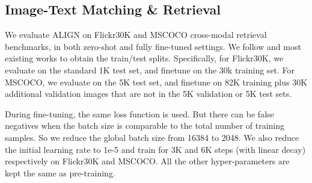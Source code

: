 \documentclass{article}
\begin{document}
\begin{table}[t]
\centering
\small
\caption{Spearman's R Bootstrap Correlation () on Crisscrossed Captions~(CxC) dataset. ALIGN is compared with VSE++~\cite{faghri:vse++}, VSRN~\cite{li:vsrn}, DE\textsubscript{I2T}~\cite{parekh:cxc}, and DE\textsubscript{T2T+I2T}~\cite{parekh:cxc}.}
\label{tab:cxc_spearman_corr}
\vspace{2mm}
\vspace{-5mm}
\end{table}

\vspace{-2mm}
\subsection{Image-Text Matching \& Retrieval}

We evaluate ALIGN on Flickr30K and MSCOCO cross-modal retrieval benchmarks, in both zero-shot and fully fine-tuned settings. We follow \cite{karpathy:image-text2015} and most existing works to obtain the train/test splits. Specifically, for Flickr30K, we evaluate on the standard 1K test set, and finetune on the 30k training set. For MSCOCO, we evaluate on the 5K test set, and finetune on 82K training plus 30K additional validation images that are not in the 5K validation or 5K test sets.

During fine-tuning, the same loss function is used. But there can be false negatives when the batch size is comparable to the total number of training samples. So we reduce the global batch size from 16384 to 2048. We also reduce the initial learning rate to 1e-5 and train for 3K and 6K steps (with linear decay) respectively on Flickr30K and MSCOCO. All the other hyper-parameters are kept the same as pre-training.
\end{document}
